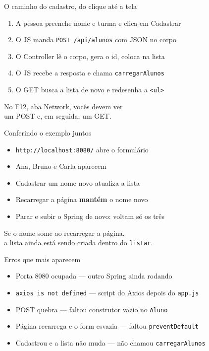 \documentclass[aspectratio=169,11pt]{beamer}
\begin{document}
\begin{frame}{O caminho do cadastro, do clique até a tela}
  \begin{enumerate}
    \item A pessoa preenche nome e turma e clica em Cadastrar
    \item O JS manda \texttt{POST /api/alunos} com JSON no corpo
    \item O Controller lê o corpo, gera o id, coloca na lista
    \item O JS recebe a resposta e chama \texttt{carregarAlunos}
    \item O GET busca a lista de novo e redesenha a \texttt{<ul>}
  \end{enumerate}

  \vspace{0.5em}
  No F12, aba Network, vocês devem ver\\
  um POST e, em seguida, um GET.
\end{frame}

\begin{frame}{Conferindo o exemplo juntos}
  \begin{itemize}
    \item [ ] \texttt{http://localhost:8080/} abre o formulário
    \item [ ] Ana, Bruno e Carla aparecem
    \item [ ] Cadastrar um nome novo atualiza a lista
    \item [ ] Recarregar a página \textbf{mantém} o nome novo
    \item [ ] Parar e subir o Spring de novo: voltam só os três
  \end{itemize}

  \vspace{0.5em}
  Se o nome some ao recarregar a página,\\
  a lista ainda está sendo criada dentro do \texttt{listar}.
\end{frame}

\begin{frame}{Erros que mais aparecem}
  \begin{itemize}
    \item Porta 8080 ocupada --- outro Spring ainda rodando
    \item \texttt{axios is not defined} --- script do Axios
          depois do \texttt{app.js}
    \item POST quebra --- faltou construtor vazio no
          \texttt{Aluno}
    \item Página recarrega e o form esvazia --- faltou
          \texttt{preventDefault}
    \item Cadastrou e a lista não muda --- não chamou
          \texttt{carregarAlunos}
  \end{itemize}
\end{frame}
\end{document}
